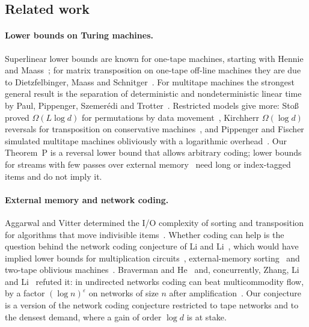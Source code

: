 \subsection{Related work}

\paragraph{Lower bounds on Turing machines.} Superlinear lower bounds are known for one-tape machines, starting with
Hennie~\cite{Hennie1965} and Maass~\cite{Maass1985}; for matrix transposition on one-tape off-line machines they are due
to Dietzfelbinger, Maass and Schnitger~\cite{DMS1991,DietzfelbingerMaass1993}. For multitape machines the strongest
general result is the separation of deterministic and nondeterministic linear time by Paul, Pippenger, Szemer\'edi and
Trotter~\cite{PPST1983}. Restricted models give more: Stoß proved $\Omega(L\log d)$ for permutations by data
movement~\cite{Stoss1973}, Kirchherr $\Omega(\log d)$ reversals for transposition on conservative
machines~\cite{Kirchherr1988}, and Pippenger and Fischer simulated multitape machines obliviously with a logarithmic
overhead~\cite{PippengerFischer1979}. Our Theorem~P is a reversal lower bound that allows arbitrary coding; lower bounds
for streams with few passes over external memory~\cite{GroheSchweikardt2005,GHS2009} need long or index-tagged items and
do not imply it.

\paragraph{External memory and network coding.} Aggarwal and Vitter determined the I/O complexity of sorting and
transposition for algorithms that move indivisible items~\cite{AggarwalVitter1988}. Whether coding can help is the
question behind the network coding conjecture of Li and Li~\cite{LiLi2004}, which would have implied lower bounds for
multiplication circuits~\cite{AFKL2019}, external-memory sorting~\cite{FHLS2019} and two-tape oblivious machines~\cite{AHJKL2006}.
Braverman and He~\cite{BravermanHe2026} and, concurrently, Zhang, Li and Li~\cite{ZhangLiLi2026} refuted it: in
undirected networks coding can beat multicommodity flow, by a factor $(\log n)^{\varepsilon}$ on networks of size $n$ after amplification~\cite{BGS2017}. Our conjecture is a version of the network coding
conjecture restricted to tape networks and to the densest demand, where a gain of order $\log d$ is at stake.

